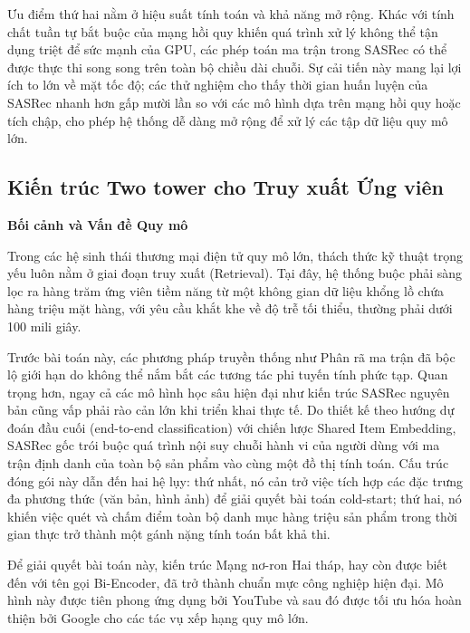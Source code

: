 Ưu điểm thứ hai nằm ở hiệu suất tính toán và khả năng mở rộng. Khác với tính chất tuần tự bắt buộc của mạng hồi quy khiến quá trình xử lý không thể tận dụng triệt để sức mạnh của GPU, các phép toán ma trận trong SASRec có thể được thực thi song song trên toàn bộ chiều dài chuỗi. Sự cải tiến này mang lại lợi ích to lớn về mặt tốc độ; các thử nghiệm cho thấy thời gian huấn luyện của SASRec nhanh hơn gấp mười lần so với các mô hình dựa trên mạng hồi quy hoặc tích chập, cho phép hệ thống dễ dàng mở rộng để xử lý các tập dữ liệu quy mô lớn.

\subsection{Kiến trúc Two tower cho Truy xuất Ứng viên}

\noindent \textbf{Bối cảnh và Vấn đề Quy mô}

Trong các hệ sinh thái thương mại điện tử quy mô lớn, thách thức kỹ thuật trọng yếu luôn nằm ở giai đoạn truy xuất (Retrieval). Tại đây, hệ thống buộc phải sàng lọc ra hàng trăm ứng viên tiềm năng từ một không gian dữ liệu khổng lồ chứa hàng triệu mặt hàng, với yêu cầu khắt khe về độ trễ tối thiểu, thường phải dưới 100 mili giây.

Trước bài toán này, các phương pháp truyền thống như Phân rã ma trận đã bộc lộ giới hạn do không thể nắm bắt các tương tác phi tuyến tính phức tạp. Quan trọng hơn, ngay cả các mô hình học sâu hiện đại như kiến trúc SASRec nguyên bản \cite{7} cũng vấp phải rào cản lớn khi triển khai thực tế. Do thiết kế theo hướng dự đoán đầu cuối (end-to-end classification) với chiến lược Shared Item Embedding, SASRec gốc trói buộc quá trình nội suy chuỗi hành vi của người dùng với ma trận định danh của toàn bộ sản phẩm vào cùng một đồ thị tính toán. Cấu trúc đóng gói này dẫn đến hai hệ lụy: thứ nhất, nó cản trở việc tích hợp các đặc trưng đa phương thức (văn bản, hình ảnh) để giải quyết bài toán cold-start; thứ hai, nó khiến việc quét và chấm điểm toàn bộ danh mục hàng triệu sản phẩm trong thời gian thực trở thành một gánh nặng tính toán bất khả thi.

Để giải quyết bài toán này, kiến trúc Mạng nơ-ron Hai tháp, hay còn được biết đến với tên gọi Bi-Encoder, đã trở thành chuẩn mực công nghiệp hiện đại. Mô hình này được tiên phong ứng dụng bởi YouTube \cite{9} và sau đó được tối ưu hóa hoàn thiện bởi Google \cite{8} cho các tác vụ xếp hạng quy mô lớn.

\vspace{0.3cm}


